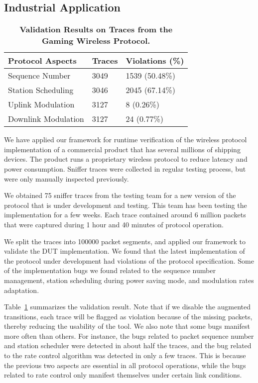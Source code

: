 \subsection{Industrial Application}
\label{subsec:xbox}

\begin{table}[t!]
  \centering
  \begin{tabular}{lll}
    \toprule
    \textbf{Protocol Aspects} & \textbf{Traces} & \textbf{Violations (\%)}\\
    \midrule
    Sequence Number & 3049 & 1539 (50.48\%) \\
    Station Scheduling & 3046 & 2045 (67.14\%) \\
    Uplink Modulation & 3127 & 8 (0.26\%) \\
    Downlink Modulation & 3127 & 24 (0.77\%) \\
    \bottomrule
  \end{tabular}
  \caption{\textbf{Validation Results on Traces from the Gaming Wireless Protocol.}}
  \label{tab:xbox}
\end{table}

We have applied our framework for runtime verification of the wireless protocol
implementation of a commercial product that has several millions of shipping
devices. The product runs a proprietary wireless protocol to reduce latency and
power consumption. Sniffer traces were collected in regular testing process, but
were only manually inspected previously. 

We obtained 75 sniffer traces from the testing team for a new version of the
protocol that is under development and testing. This team has been testing the
implementation for a few weeks.  Each trace contained around 6 million packets
that were captured during 1 hour and 40 minutes of protocol operation.

We split the traces into \num{100000} packet segments, and applied our framework
to validate the DUT implementation. We found that the latest implementation of
the protocol under development had violations of the protocol specification.
Some of the implementation bugs we found related to the sequence number
management, station scheduling during power saving mode, and modulation rates
adaptation.

Table~\ref{tab:xbox} summarizes the validation result. Note that if we disable
the augmented transitions, each trace will be flagged as violation because of
the missing packets, thereby reducing the usability of the tool. We also note
that some bugs manifest more often than others. For instance, the bugs related
to packet sequence number and station scheduler were detected in about half the
traces, and the bug related to the rate control algorithm was detected in only a
few traces. This is because the previous two aspects are essential in all
protocol operations, while the bugs related to rate control only manifest
themselves under certain link conditions.

